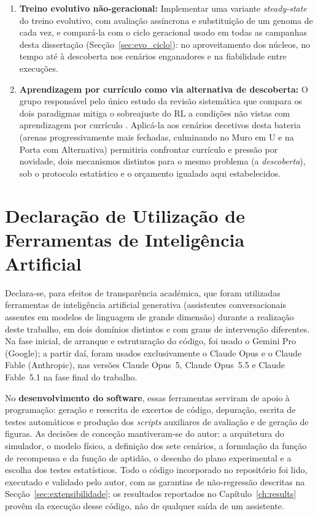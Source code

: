 \documentclass[12pt,reqno, twoside]{amsbook}
\theoremstyle{plain}
\numberwithin{equation}{chapter}
\numberwithin{section}{chapter}
\numberwithin{table}{chapter}
\numberwithin{figure}{chapter}
\begin{document}
\begin{enumerate}
    \item \textbf{Treino evolutivo não-geracional:} Implementar uma variante \textit{steady-state} do treino evolutivo, com avaliação assíncrona e substituição de um genoma de cada vez, e compará-la com o ciclo geracional usado em todas as campanhas desta dissertação (Secção~\ref{sec:evo_ciclo}): no aproveitamento dos núcleos, no tempo até à descoberta nos cenários enganadores e na fiabilidade entre execuções.
    \item \textbf{Aprendizagem por currículo como via alternativa de descoberta:} O grupo responsável pelo único estudo da revisão sistemática que compara os dois paradigmas mitiga o sobreajuste do RL a condições não vistas com aprendizagem por currículo \cite{iskandar2025phd}. Aplicá-la aos cenários decetivos desta bateria (arenas progressivamente mais fechadas, culminando no Muro em U e na Porta com Alternativa) permitiria confrontar currículo e pressão por novidade, dois mecanismos distintos para o mesmo problema (a \emph{descoberta}), sob o protocolo estatístico e o orçamento igualado aqui estabelecidos.
\end{enumerate}

\printbibliography[title={Referências Bibliográficas}]

\appendix

\chapter{Declaração de Utilização de Ferramentas de Inteligência Artificial}
\label{apx:ia}
Declara-se, para efeitos de transparência académica, que foram utilizadas ferramentas de inteligência artificial generativa (assistentes conversacionais assentes em modelos de linguagem de grande dimensão) durante a realização deste trabalho, em dois domínios distintos e com graus de intervenção diferentes. Na fase inicial, de arranque e estruturação do código, foi usado o Gemini Pro (Google); a partir daí, foram usados exclusivamente o Claude Opus e o Claude Fable (Anthropic), nas versões Claude Opus~5, Claude Opus~5.5 e Claude Fable~5.1 na fase final do trabalho.

No \textbf{desenvolvimento do software}, essas ferramentas serviram de apoio à programação: geração e reescrita de excertos de código, depuração, escrita de testes automáticos e produção dos \textit{scripts} auxiliares de avaliação e de geração de figuras. As decisões de conceção mantiveram-se do autor: a arquitetura do simulador, o modelo físico, a definição dos sete cenários, a formulação da função de recompensa e da função de aptidão, o desenho do plano experimental e a escolha dos testes estatísticos. Todo o código incorporado no repositório foi lido, executado e validado pelo autor, com as garantias de não-regressão descritas na Secção~\ref{sec:extensibilidade}; os resultados reportados no Capítulo~\ref{ch:results} provêm da execução desse código, não de qualquer saída de um assistente.
\end{document}
